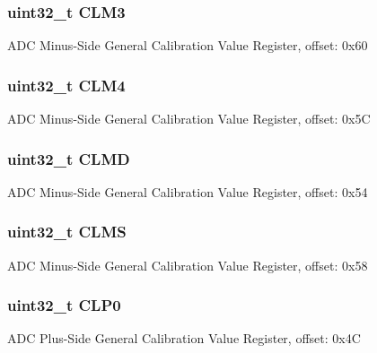 \subsubsection[{C\+L\+M3}]{\setlength{\rightskip}{0pt plus 5cm}uint32\+\_\+t C\+L\+M3}\label{struct_a_d_c___mem_map_aadc0a60c45854df3d46a33790759ef5f}
A\+D\+C Minus-\/\+Side General Calibration Value Register, offset\+: 0x60 \hypertarget{struct_a_d_c___mem_map_aead273022ba55e043f5e0a81d9c5b7c8}{}
\subsubsection[{C\+L\+M4}]{\setlength{\rightskip}{0pt plus 5cm}uint32\+\_\+t C\+L\+M4}\label{struct_a_d_c___mem_map_aead273022ba55e043f5e0a81d9c5b7c8}
A\+D\+C Minus-\/\+Side General Calibration Value Register, offset\+: 0x5\+C \hypertarget{struct_a_d_c___mem_map_a42f179fbfbc8051ccb50bc11792ef3ee}{}
\subsubsection[{C\+L\+M\+D}]{\setlength{\rightskip}{0pt plus 5cm}uint32\+\_\+t C\+L\+M\+D}\label{struct_a_d_c___mem_map_a42f179fbfbc8051ccb50bc11792ef3ee}
A\+D\+C Minus-\/\+Side General Calibration Value Register, offset\+: 0x54 \hypertarget{struct_a_d_c___mem_map_aef7c15535415480c4d2ca4d7cc86deab}{}
\subsubsection[{C\+L\+M\+S}]{\setlength{\rightskip}{0pt plus 5cm}uint32\+\_\+t C\+L\+M\+S}\label{struct_a_d_c___mem_map_aef7c15535415480c4d2ca4d7cc86deab}
A\+D\+C Minus-\/\+Side General Calibration Value Register, offset\+: 0x58 \hypertarget{struct_a_d_c___mem_map_a8297494e7932e271cc59eb5aa896a10e}{}
\subsubsection[{C\+L\+P0}]{\setlength{\rightskip}{0pt plus 5cm}uint32\+\_\+t C\+L\+P0}\label{struct_a_d_c___mem_map_a8297494e7932e271cc59eb5aa896a10e}
A\+D\+C Plus-\/\+Side General Calibration Value Register, offset\+: 0x4\+C \hypertarget{struct_a_d_c___mem_map_a64450733d1755c38f9466f948ed168c5}{}
